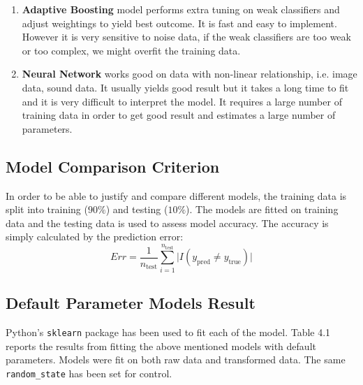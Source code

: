 \documentclass[11pt]{article}
\begin{document}
\begin{enumerate}[(1)]
\item \textbf{Adaptive Boosting} model performs extra tuning on weak classifiers and adjust weightings to yield best outcome. It is fast and easy to implement. However it is very sensitive to noise data, if the weak classifiers are too weak or too complex, we might overfit the training data.

\item \textbf{Neural Network} works good on data with non-linear relationship, i.e. image data, sound data. It usually yields good result but it takes a long time to fit and it is very difficult to interpret the model. It requires a large number of training data in order to get good result and estimates a large number of parameters.
\end{enumerate}

\subsection{Model Comparison Criterion}
In order to be able to justify and compare different models, the training data is split into training ($90\%$) and testing ($10\%$). The models are fitted on training data and the testing data is used to assess model accuracy. The accuracy is simply calculated by the prediction error:
$$Err = \frac{1}{n_{\text{test}}}\sum\limits_{i=1}^{n_{\text{test}}}\vert I(y_{\text{pred}} \neq y_{\text{true}}) \vert$$

\subsection{Default Parameter Models Result}
Python's \texttt{sklearn} package has been used to fit each of the model. Table 4.1 reports the results from fitting the above mentioned models with default parameters. Models were fit on both raw data and transformed data. The same \texttt{random\_state} has been set for control. \\
\end{document}
